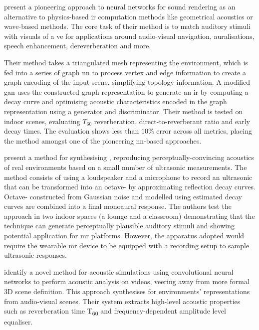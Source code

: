 \cite{ratnarajah2022mesh2ir} present a pioneering approach to neural networks for sound rendering as an alternative to physics-based \acrshort{ir} computation methods like geometrical acoustics or wave-based methods. The core task of their method is to match auditory stimuli with visuals of a \acrshort{ve} for applications around audio-visual navigation, auralisations, speech enhancement, dereverberation and more.\par
Their method takes a triangulated mesh representing the environment, which is fed into a series of graph \acrshort{nn} to process vertex and edge information to create a graph encoding of the input scene, simplifying topology information. A modified \acrfull{gan} uses the constructed graph representation to generate an \acrshort{ir} by computing a decay curve and optimising acoustic characteristics encoded in the graph representation using a generator and discriminator. Their method is tested on indoor scenes, evaluating $T_{60}$ reverberation, direct-to-reverberant ratio and early decay times. The evaluation shows less than $10\%$ error across all metrics, placing the method amongst one of the pioneering \acrshort{nn}-based approaches.\par

\cite{yang2020fast} present a method for synthesising , reproducing perceptually-convincing acoustics of real environments based on a small number of ultrasonic measurements. The method consists of using a loudspeaker and a microphone to record an ultrasonic  that can be transformed into an octave- by approximating reflection decay curves. Octave- constructed from Gaussian noise and modelled using estimated decay curves are combined into a final monoaural response. The authors test the approach in two indoor spaces (a lounge and a classroom) demonstrating that the technique can generate perceptually plausible auditory stimuli and showing potential application for \acrshort{mr} platforms. However, the apparatus adopted would require the wearable \acrshort{mr} device to be equipped with a recording setup to sample ultrasonic responses.\par

\cite{li2018scene} identify a novel method for acoustic simulations using convolutional neural networks to perform acoustic analysis on videos, veering away from more formal 3D scene definition. This approach synthesises  for environments' representations from audio-visual scenes. Their system extracts high-level acoustic properties such as reverberation time T\textsubscript{60} and frequency-dependent amplitude level equaliser.\par

